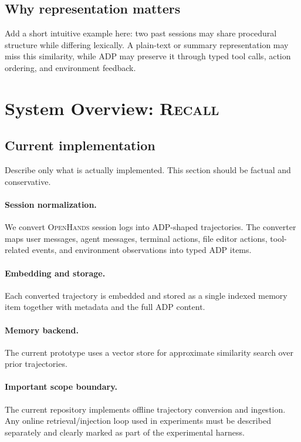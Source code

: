 \documentclass{article}
\newcommand{\Recall}{\textsc{Recall}}
\newcommand{\ADP}{\textsc{ADP}}
\newcommand{\OH}{\textsc{OpenHands}}
\begin{document}
\subsection{Why representation matters}
Add a short intuitive example here:
two past sessions may share procedural structure while differing lexically.
A plain-text or summary representation may miss this similarity, while \ADP{} may preserve it through
typed tool calls, action ordering, and environment feedback.

\section{System Overview: \Recall{}}

\subsection{Current implementation}
Describe only what is actually implemented.
This section should be factual and conservative.

\paragraph{Session normalization.}
We convert \OH{} session logs into \ADP{}-shaped trajectories.
The converter maps user messages, agent messages, terminal actions, file editor actions,
tool-related events, and environment observations into typed \ADP{} items.

\paragraph{Embedding and storage.}
Each converted trajectory is embedded and stored as a single indexed memory item together with metadata
and the full \ADP{} content.

\paragraph{Memory backend.}
The current prototype uses a vector store for approximate similarity search over prior trajectories.

\paragraph{Important scope boundary.}
The current repository implements offline trajectory conversion and ingestion.
Any online retrieval/injection loop used in experiments must be described separately and clearly marked as
part of the experimental harness.
\end{document}
